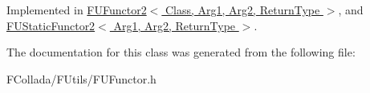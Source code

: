 Implemented in \hyperlink{classFUFunctor2_ac601e3c1fe7e07ee1136adcf0cce6cec}{FUFunctor2$<$ Class, Arg1, Arg2, ReturnType $>$}, and \hyperlink{classFUStaticFunctor2_a8e81b2ae65b8b5afbdc8a88aa4d090ed}{FUStaticFunctor2$<$ Arg1, Arg2, ReturnType $>$}.



The documentation for this class was generated from the following file:\begin{DoxyCompactItemize}
\item 
FCollada/FUtils/FUFunctor.h\end{DoxyCompactItemize}
